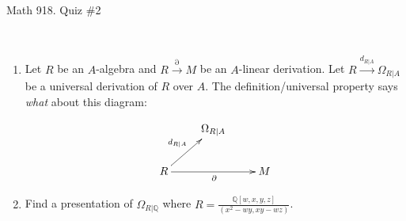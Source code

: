 \documentclass[12pt]{amsart}
\newcommand{\Q}{\mathbb{Q}}
\begin{document}
	
	\thispagestyle{empty}
	
	\begin{center}
		\Large{Math 918. Quiz \#2 }\\

	\end{center}
	
	

	
	\
	
	\begin{enumerate}
	
	
	
	\item Let $R$ be an $A$-algebra and $R \xrightarrow{\partial} M$ be an $A$-linear derivation. Let $R \xrightarrow{d_{R|A}} \Omega_{R|A}$ be a universal derivation of $R$ over $A$. The definition/universal property says \emph{what} about this diagram:
	
\[ \xymatrix{ & \Omega_{R|A} & \\
R\ar[rr]_{\partial} \ar[ur]^{d_{R|A}} && M }\]
	
	
		
	\vfill
	
	\item Find a presentation of $\Omega_{R|\Q}$ where $R=\displaystyle
	\frac{\Q[w,x,y,z]}{(x^2-wy,xy-wz)}$.
	\vfill
		\vfill	
	
	\end{enumerate}
	
	
	
\end{document}
